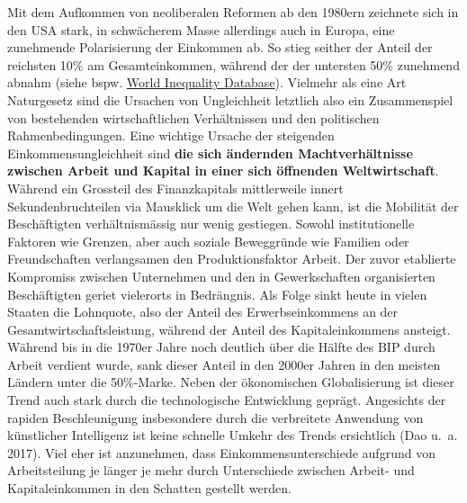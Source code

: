 \documentclass[
  nswissgerman,
  a4paper,
  DIV=11,
  numbers=noendperiod,
  oneside,
  openany]{scrreprt}
\begin{document}
Mit dem Aufkommen von neoliberalen Reformen ab den 1980ern zeichnete
sich in den USA stark, in schwächerem Masse allerdings auch in Europa,
eine zunehmende Polarisierung der Einkommen ab. So stieg seither der
Anteil der reichsten 10\% am Gesamteinkommen, während der der untersten
50\% zunehmend abnahm (siehe bspw. \href{https://wid.world/}{World
Inequality Database}). Vielmehr als eine Art Naturgesetz sind die
Ursachen von Ungleichheit letztlich also ein Zusammenspiel von
bestehenden wirtschaftlichen Verhältnissen und den politischen
Rahmenbedingungen. Eine wichtige Ursache der steigenden
Einkommensungleichheit sind \textbf{die sich ändernden Machtverhältnisse
zwischen Arbeit und Kapital in einer sich öffnenden Weltwirtschaft}.
Während ein Grossteil des Finanzkapitals mittlerweile innert
Sekundenbruchteilen via Mausklick um die Welt gehen kann, ist die
Mobilität der Beschäftigten verhältnismässig nur wenig gestiegen. Sowohl
institutionelle Faktoren wie Grenzen, aber auch soziale Beweggründe wie
Familien oder Freundschaften verlangsamen den Produktionsfaktor Arbeit.
Der zuvor etablierte Kompromiss zwischen Unternehmen und den in
Gewerkschaften organisierten Beschäftigten geriet vielerorts in
Bedrängnis. Als Folge sinkt heute in vielen Staaten die Lohnquote, also
der Anteil des Erwerbseinkommens an der Gesamtwirtschaftsleistung,
während der Anteil des Kapitaleinkommens ansteigt. Während bis in die
1970er Jahre noch deutlich über die Hälfte des BIP durch Arbeit verdient
wurde, sank dieser Anteil in den 2000er Jahren in den meisten Ländern
unter die 50\%-Marke. Neben der ökonomischen Globalisierung ist dieser
Trend auch stark durch die technologische Entwicklung geprägt.
Angesichts der rapiden Beschleunigung insbesondere durch die verbreitete
Anwendung von künstlicher Intelligenz ist keine schnelle Umkehr des
Trends ersichtlich (Dao u.~a. 2017). Viel eher ist anzunehmen, dass
Einkommensunterschiede aufgrund von Arbeitsteilung je länger je mehr
durch Unterschiede zwischen Arbeit- und Kapitaleinkommen in den Schatten
gestellt werden.
\end{document}
